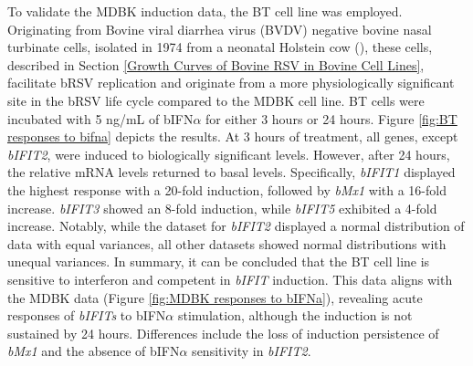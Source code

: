 To validate the MDBK induction data, the BT cell line was employed. Originating from Bovine viral diarrhea virus (BVDV) negative bovine nasal turbinate cells, isolated in 1974 from a neonatal Holstein cow (\cite{McClurkin1974ComparisonVirus}), these cells, described in Section \ref{Growth Curves of Bovine RSV in Bovine Cell Lines}, facilitate bRSV replication and originate from a more physiologically significant site in the bRSV life cycle compared to the MDBK cell line. BT cells were incubated with 5 ng/mL of bIFN\(\alpha\) for either 3 hours or 24 hours. Figure \ref{fig:BT responses to bifna} depicts the results. At 3 hours of treatment, all genes, except \textit{bIFIT2}, were induced to biologically significant levels. However, after 24 hours, the relative mRNA levels returned to basal levels. Specifically, \textit{bIFIT1} displayed the highest response with a 20-fold induction, followed by \textit{bMx1} with a 16-fold increase. \textit{bIFIT3} showed an 8-fold induction, while \textit{bIFIT5} exhibited a 4-fold increase. Notably, while the dataset for \textit{bIFIT2} displayed a normal distribution of data with equal variances, all other datasets showed normal distributions with unequal variances. In summary, it can be concluded that the BT cell line is sensitive to interferon and competent in \textit{bIFIT} induction. This data aligns with the MDBK data (Figure \ref{fig:MDBK responses to bIFNa}), revealing acute responses of \textit{bIFITs} to bIFN\(\alpha\) stimulation, although the induction is not sustained by 24 hours. Differences include the loss of induction persistence of \textit{bMx1} and the absence of bIFN\(\alpha\) sensitivity in \textit{bIFIT2}.

